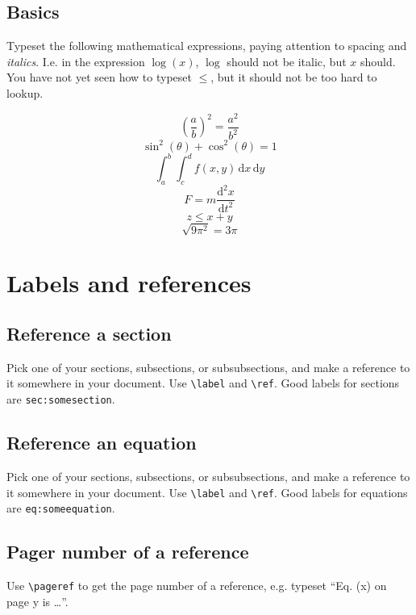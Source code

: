 \documentclass[a4paper, 12pt]{article}
\begin{document}
\subsection{Basics}
Typeset the following mathematical expressions, paying attention to spacing and \textit{italics}. I.e. in the expression $\log(x)$, $\log$ should not be italic, but $x$ should. You have not yet seen how to typeset $\leq$, but it should not be too hard to lookup.
\begin{multicols}{2}
\noindent
\begin{equation}
\left(\frac{a}{b}\right)^2 = \frac{a^2}{b^2}
\end{equation}
\begin{equation}
\sin^2(\theta) + \cos^2(\theta) = 1
\end{equation}
\begin{equation}
\int_a^b\int_c^d f(x,y) \, \mathrm{d} x \, \mathrm{d} y
\end{equation}
\begin{equation}
F = m\frac{\mathrm{d}^2 x}{\mathrm{d}t^2}
\end{equation}
\begin{equation}
z \leq x+y
\end{equation}
\begin{equation}
\sqrt{9\pi^2} = 3\pi
\end{equation}
\end{multicols}


\section{Labels and references}
\subsection{Reference a section}
Pick one of your sections, subsections, or subsubsections, and make a reference to it somewhere in your document. Use \verb!\label! and \verb!\ref!. Good labels for sections are \verb!sec:somesection!.

\subsection{Reference an equation}
Pick one of your sections, subsections, or subsubsections, and make a reference to it somewhere in your document. Use \verb!\label! and \verb!\ref!. Good labels for equations are \verb!eq:someequation!.

\subsection{Pager number of a reference}
Use \verb!\pageref! to get the page number of a reference, e.g. typeset ``Eq. (x) on page y is \ldots ''.
\end{document}
